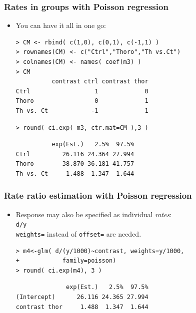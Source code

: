 \documentclass[handout,12pt,dvipsnames,t]{beamer}
\begin{document}
\begin{frame}[fragile]
\frametitle{Rates in groups with Poisson regression}
\begin{itemize}[<+->]
\item You can have it all in one go:
\lstset{basicstyle=\ttfamily\footnotesize}
\begin{lstlisting}
> CM <- rbind( c(1,0), c(0,1), c(-1,1) )
> rownames(CM) <- c("Ctrl","Thoro","Th vs.Ct")
> colnames(CM) <- names( coef(m3) )
> CM
          contrast ctrl contrast thor
Ctrl                  1             0
Thoro                 0             1
Th vs. Ct            -1             1
\end{lstlisting}

\begin{lstlisting}
> round( ci.exp( m3, ctr.mat=CM ),3 )
\end{lstlisting}
\begin{lstlisting}
          exp(Est.)   2.5%  97.5%
Ctrl         26.116 24.364 27.994
Thoro        38.870 36.181 41.757
Th vs. Ct     1.488  1.347  1.644
\end{lstlisting}
\normalsize
\end{itemize}
\end{frame}

\begin{frame}[fragile]
\frametitle{Rate ratio estimation with Poisson regression}

\begin{itemize}
\item Response may also be specified as individual {\it rates}:\\
{\tt d/y} \\
{\tt weights=} instead of {\tt offset=} are needed.
\lstset{basicstyle=\ttfamily\footnotesize}
\begin{lstlisting}
> m4<-glm( d/(y/1000)~contrast, weights=y/1000,
+            family=poisson)
> round( ci.exp(m4), 3 )
\end{lstlisting}
\begin{lstlisting}
              exp(Est.)   2.5%  97.5%
(Intercept)      26.116 24.365 27.994
contrast thor     1.488  1.347  1.644
\end{lstlisting}
\normalsize
\end{itemize}
\end{frame}
\end{document}

